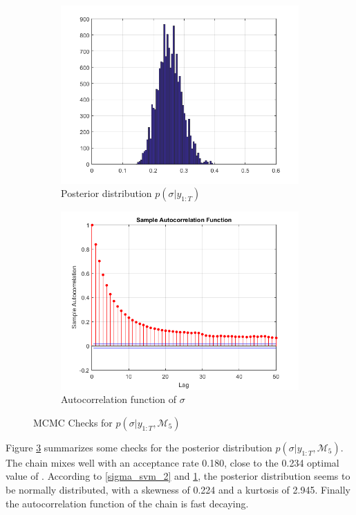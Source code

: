 \documentclass[11pt,a4,twosided,singlespacing,titlepagenumber=on]{scrreprt}
\numberwithin{equation}{chapter} %
\theoremstyle{remark}
\begin{document}
\begin{figure}[H]
\begin{subfigure}[t]{0.49\textwidth}
        \includegraphics[width=1\textwidth]{sigma_svm/3}
        \caption{Posterior distribution $p(\sigma|y_{1:T})$}
        \label{sigma_svm_3}
    \end{subfigure}
    \begin{subfigure}[t]{0.49\textwidth}
        \centering
        \includegraphics[width=1\textwidth]{sigma_svm/4}
        \caption{Autocorrelation function of $\sigma$}
        \label{sigma_svm_4}
    \end{subfigure}
    \caption{MCMC Checks for $p(\sigma|y_{1:T}, \mathcal{M}_5)$}
    \label{sigma_svm_checks}
\end{figure}

Figure \ref{sigma_svm_checks} summarizes some checks for the posterior distribution $p(\sigma|y_{1:T}, \mathcal{M}_5)$. The chain mixes well with an acceptance rate 0.180, close to the 0.234 optimal value of \cite{roberts1997}. According to \ref{sigma_svm_2} and \ref{sigma_svm_3}, the posterior distribution seems to be normally distributed, with a skewness of 0.224 and a kurtosis of 2.945. Finally the autocorrelation function of the chain is fast decaying. 
\end{document}
